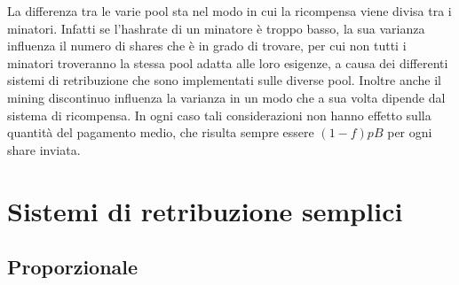 La differenza tra le varie pool sta nel modo in cui la ricompensa viene divisa tra i minatori. Infatti se l'hashrate di un minatore è troppo basso, la sua varianza influenza il numero di shares che è in grado di trovare, per cui non tutti i minatori troveranno la stessa pool adatta alle loro esigenze, a causa dei differenti sistemi di retribuzione che sono implementati sulle diverse pool. Inoltre anche il mining discontinuo influenza la varianza in un modo che a sua volta dipende dal sistema di ricompensa.
In ogni caso tali considerazioni non hanno effetto sulla quantità del pagamento medio, che risulta sempre essere $(1-f)pB$ per ogni share inviata.

\section{Sistemi di retribuzione semplici}

\subsection{Proporzionale}

